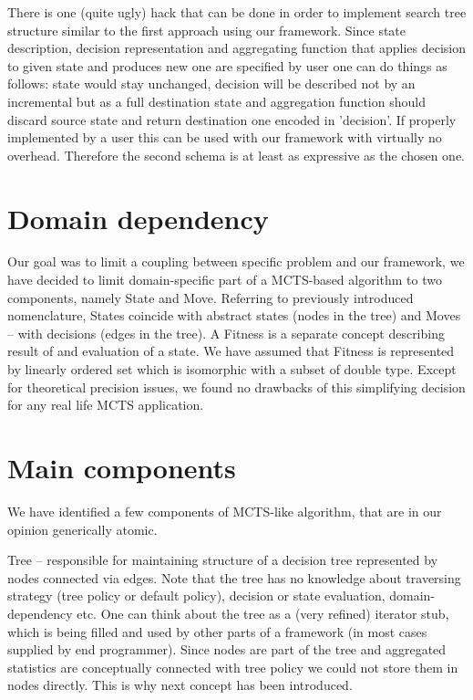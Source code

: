 There is one (quite ugly) hack that can be done in order to implement search
tree structure similar to the first approach using our framework. Since state
description, decision representation and aggregating function that applies
decision to given state and produces new one are specified by user one can do
things as follows: state would stay unchanged, decision will be described not
by an incremental but as a full destination state and aggregation function
should discard source state and return destination one encoded in 'decision'.
If properly implemented by a user this can be used with our framework with
virtually no overhead. Therefore the second schema is at least as expressive as
the chosen one.

\section{Domain dependency}
Our goal was to limit a coupling between specific problem and our framework,
we have decided to limit domain-specific part of a MCTS-based algorithm to two
components, namely State and Move. Referring to previously introduced
nomenclature, States coincide with abstract states (nodes in the tree) and
Moves -- with decisions (edges in the tree).
A Fitness is a separate concept describing result of and evaluation of a state.
We have assumed that Fitness is represented by linearly ordered set which is
isomorphic with a subset of double type.
Except for theoretical precision issues, we found no drawbacks of this
simplifying decision for any real life MCTS application.

\section{Main components}
We have identified a few components of MCTS-like algorithm, that are in our
opinion generically atomic.

Tree -- responsible for maintaining structure of a decision tree
represented by nodes connected via edges.
Note that the tree has no knowledge about traversing strategy (tree policy or
default policy), decision or state evaluation, domain-dependency etc. One can
think about the tree as a (very refined) iterator stub, which is being filled
and used by other parts of a framework (in most cases supplied by end
programmer).
Since nodes are part of the tree and aggregated statistics are conceptually
connected with tree policy we could not store them in nodes directly. This is
why next concept has been introduced.

